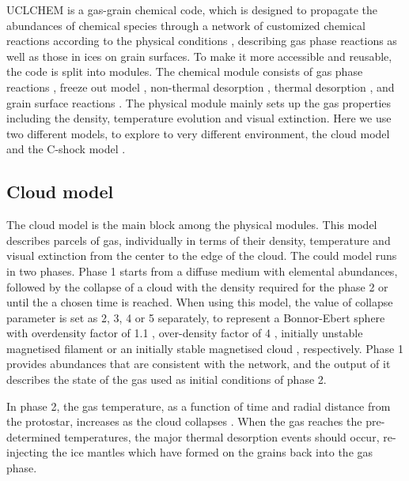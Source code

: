 \documentclass{aa}
\begin{document}
\begin{CJK*}{UTF8}{gbsn}
   UCLCHEM is a gas-grain chemical code, which is designed to propagate the abundances of chemical species through a network of customized chemical reactions according to the physical conditions \citep{holdship2017uclchem}, describing gas phase reactions as well as those in ices on grain surfaces. To make it more accessible and reusable, the code is split into modules. The chemical module consists of gas phase reactions \citep{mcelroy2013umist}, freeze out model \citep{rawlings1992direct}, non-thermal desorption \citep{roberts2007desorption}, thermal desorption \citep{ayotte2001effect,burke2010ice}, and grain surface reactions \citep{hasegawa1992models,occhiogrosso2014ethylene}. The physical module mainly sets up the gas properties including the density, temperature evolution and visual extinction. Here we use two different models, to explore to very different environment,  the cloud model \citep{viti2004evaporation} and the C-shock model \citep{jimenez2008parametrization}.
   
\subsection{Cloud model}
   
  The cloud model is the main block among the physical modules. This model describes parcels of gas, individually in terms of their density, temperature and visual extinction from the center to the edge of the cloud. The could model runs in two phases. 
   Phase 1 starts from a diffuse medium with elemental abundances, followed by the collapse of a cloud with the density required for the phase 2 or until the a chosen time is reached.
   When using this model, the value of collapse parameter is set as 2, 3, 4 or 5 separately, to represent a Bonnor-Ebert sphere with overdensity factor of 1.1 \citep{aikawa2005molecular}, over-density factor of 4 \citep{aikawa2005molecular}, initially unstable magnetised filament \citep{tamaki1995effect} or an initially stable magnetised cloud \citep{fiedler1993ambipolar}, respectively. Phase 1 provides abundances that are consistent with the network, and the output of it describes the state of the gas used as initial conditions of phase 2.
   
   In phase 2, the gas temperature, as a function of time and radial distance from the protostar, increases as the cloud collapses \citep{viti2004evaporation}. When the gas reaches the pre-determined temperatures, the major thermal desorption events should occur, re-injecting the ice mantles which have formed on the grains back into the gas phase. 
   

\end{CJK*}
\end{document}
